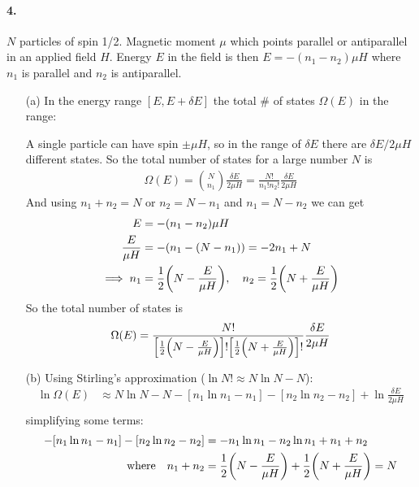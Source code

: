 \documentclass[../main.tex]{subfiles}
\begin{document}
\paragraph{4.} $N$ particles of spin 1/2. Magnetic moment $\mu$ which points parallel or antiparallel in an applied field $H$.
Energy $E$ in the field is then $E = - (n_1 - n_2) \mu H$ where $n_1$ is parallel and $n_2$ is antiparallel.
\begin{itemize}
    \item [(a)] In the energy range $[E, E + \delta E]$ the total \# of states $\Omega(E)$ in the range:

    A single particle can have spin $\pm \mu H$, so in the range of $\delta E$ there are $\delta E / 2\mu H$ different states.
    So the total number of states for a large number $N$ is
    \begin{align*}
        \Omega(E) = \binom{N}{n_1} \frac{\delta E}{2\mu H} = \frac{N!}{n_1! n_2!} \frac{\delta E}{2\mu H}
    \end{align*}
    And using $n_1 + n_2 = N$ or $n_2 = N - n_1$ and $n_1 = N - n_2$ we can get
    \begin{align*}
        E &= - (n_1 - n_2) \mu H \\
        \frac{E}{\mu H} &= - (n_1 - (N - n_1)) = -2n_1 + N \\
        \implies n_1 &= \frac{1}{2} \qt(N - \frac{E}{\mu H}), \quad n_2 = \frac{1}{2} \qt(N + \frac{E}{\mu H})
    \end{align*} 
    So the total number of states is
    \begin{align*}
        \Omega(E) = \frac{N!}{\qt[\frac{1}{2} \qt(N - \frac{E}{\mu H})]!\qt[\frac{1}{2} \qt(N + \frac{E}{\mu H})]!} \frac{\delta E}{2\mu H}
    \end{align*}
    \item [(b)] Using Stirling's approximation ($\ln N! \approx N \ln N - N$):
    \begin{align*}
        \ln \Omega(E) &\approx N \ln N - N - [n_1 \ln n_1 - n_1] - [n_2 \ln n_2 - n_2] + \ln \frac{\delta E}{2\mu H} \\
    \end{align*}
    simplifying some terms:
    \begin{align*}
        -[n_1 \ln n_1 - n_1] - [n_2 \ln n_2 - n_2] &= -n_1 \ln n_1 - n_2 \ln n_1 + n_1 + n_2 \\
        \qq{where} n_1 + n_2 &= \frac{1}{2} \qt(N - \frac{E}{\mu H}) + \frac{1}{2} \qt(N + \frac{E}{\mu H}) = N
    \end{align*}

\end{itemize}
\end{document}
